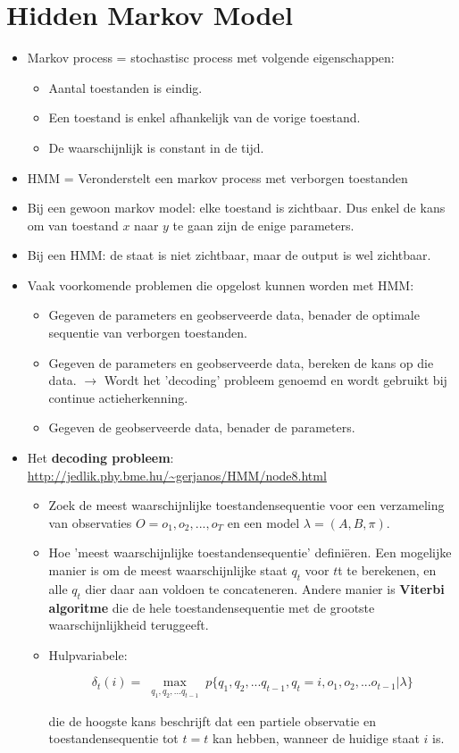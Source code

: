 \section{Hidden Markov Model}
\label{sec:hidden_markov_model}
	\begin{itemize}
	\item Markov process = stochastisc process met volgende eigenschappen:
	\begin{itemize}
		\item Aantal toestanden is eindig.
		\item Een toestand is enkel afhankelijk van de vorige toestand.
		\item De waarschijnlijk is constant in de tijd.
	\end{itemize}
	\item HMM = Veronderstelt een markov process met verborgen toestanden
	\item Bij een gewoon markov model: elke toestand is zichtbaar. Dus enkel de kans om van toestand $x$ naar $y$ te gaan zijn de enige parameters. 
	\item Bij een HMM: de staat is niet zichtbaar, maar de output is wel zichtbaar.
	\item Vaak voorkomende problemen die opgelost kunnen worden met HMM:
	\begin{itemize}
		\item Gegeven de parameters en geobserveerde data, benader de optimale sequentie van verborgen toestanden.
		\item Gegeven de parameters en geobserveerde data, bereken de kans op die data. $\rightarrow$ Wordt het 'decoding' probleem genoemd en wordt gebruikt bij continue actieherkenning.
		\item Gegeven de geobserveerde data, benader de parameters.
	\end{itemize}
	\item Het \textbf{decoding probleem}: \url{http://jedlik.phy.bme.hu/~gerjanos/HMM/node8.html}
	\begin{itemize}
		\item Zoek de meest waarschijnlijke toestandensequentie voor een verzameling van observaties $O = o_1, o_2, ..., o_T$ en een model $\lambda = (A, B, \pi)$.
		\item Hoe 'meest waarschijnlijke toestandensequentie' definiëren. Een mogelijke manier is om de meest waarschijnlijke staat $q_t$ voor $t$t te berekenen, en alle $q_t$ dier daar aan voldoen te concateneren.
		Andere manier is \textbf{Viterbi algoritme} die de hele toestandensequentie met de grootste waarschijnlijkheid teruggeeft.
		
		\item Hulpvariabele:
		
		$$\delta_t(i) = \max_{\substack{q_1, q_2, ... q_{t-1}}} p\{q_1, q_2, ... q_{t - 1}, q_t = i, o_1, o_2, ... o_{t - 1} | \lambda \}$$
		
		die de hoogste kans beschrijft dat een partiele observatie en toestandensequentie tot $t = t$ kan hebben, wanneer de huidige staat $i$ is.
	\end{itemize}
\end{itemize}

